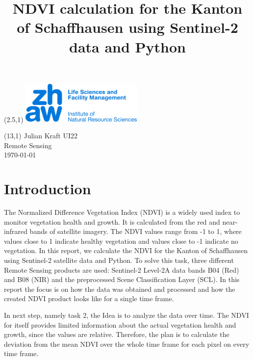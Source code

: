 \documentclass{article}
\title{NDVI calculation for the Kanton of Schaffhausen using Sentinel-2 data and Python}
\makeatletter
\renewcommand{\maketitle}{
  \begin{flushleft} 
    \Large\textmd{\@title} 
    \par
  \end{flushleft}
}
\makeatother
\begin{document}
\begin{textblock}{1}(2.5,1) %
        \includegraphics[width=6cm]{logo.jpg} %
\end{textblock}

\begin{textblock}{6}(13,1) %
        \raggedleft
        Julian Kraft UI22\\
        Remote Sensing\\
        \today
\end{textblock}

\vspace*{1.5cm}


\maketitle

\section*{Introduction}

The Normalized Difference Vegetation Index (NDVI) is a widely used index to monitor vegetation health and growth. 
It is calculated from the red and near-infrared bands of satellite imagery. The NDVI values range from -1 to 1, 
where values close to 1 indicate healthy vegetation and values close to -1 indicate no vegetation. In this report, 
we calculate the NDVI for the Kanton of Schaffhausen using Sentinel-2 satellite data and Python. To solve this task,
three different Remote Sensing products are used: Sentinel-2 Level-2A data bands B04 (Red) and B08 (NIR) and the
preprocessed Scene Classification Layer (SCL). In this report the focus is on how the data was obtained and processed
and how the created NDVI product looks like for a single time frame.

In next step, namely task 2, the Idea is to analyze the data over time. The NDVI for itself provides limited information
about the actual vegetation health and growth, since the values are relative. Therefore, the plan is to calculate the 
deviation from the mean NDVI over the whole time frame for each pixel on every time frame. 
\end{document}
